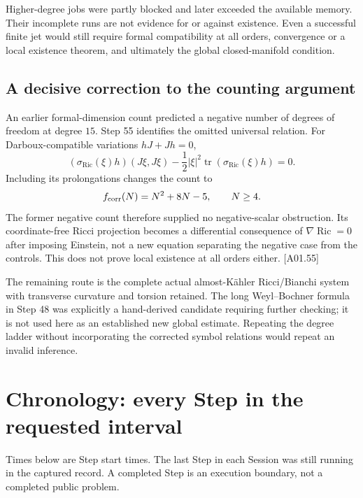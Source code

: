 \documentclass[11pt]{article}
\newcommand{\Ric}{\operatorname{Ric}}
\newcommand{\tr}{\operatorname{tr}}
\newcommand{\sref}[1]{\textsf{[#1]}}
\theoremstyle{remark}
\begin{document}
Higher-degree jobs were partly blocked and later exceeded the available
memory. Their incomplete runs are not evidence for or against existence.
Even a successful finite jet would still require formal compatibility at all
orders, convergence or a local existence theorem, and ultimately the global
closed-manifold condition.

\subsection{A decisive correction to the counting argument}
An earlier formal-dimension count predicted a negative number of degrees of
freedom at degree $15$. Step 55 identifies the omitted universal relation.
For Darboux-compatible variations $hJ+Jh=0$,
\[
 (\sigma_{\Ric}(\xi)h)(J\xi,J\xi)
 -\frac12|\xi|^2\tr(\sigma_{\Ric}(\xi)h)=0.
\]
Including its prolongations changes the count to
\[
 f_{\rm corr}(N)=N^2+8N-5,\qquad N\ge4.
\]
The former negative count therefore supplied no negative-scalar obstruction.
Its coordinate-free Ricci projection becomes a differential consequence of
$\nabla\Ric=0$ after imposing Einstein, not a new equation separating the
negative case from the controls. This does not prove local existence at all
orders either. \sref{A01.55}

The remaining route is the complete actual almost-K\"ahler
Ricci/Bianchi system with transverse curvature and torsion retained. The
long Weyl--Bochner formula in Step 48 was explicitly a hand-derived candidate
requiring further checking; it is not used here as an established new global
estimate. Repeating the degree ladder without incorporating the corrected
symbol relations would repeat an invalid inference.

\section{Chronology: every Step in the requested interval}
\label{sec:chronology}

Times below are Step start times. The last Step in each Session was still
running in the captured record. A completed Step is an execution boundary,
not a completed public problem.
\end{document}

